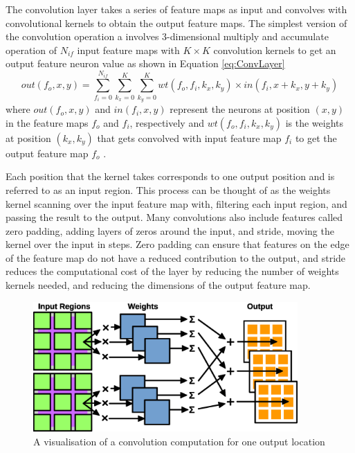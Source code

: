 \documentclass[12pt]{article}
\begin{document}
The convolution layer takes a series of feature maps as input and convolves with convolutional kernels to obtain the output feature maps. The simplest version of the convolution operation a involves 3-dimensional multiply and accumulate operation of $N_{if}$ input feature maps with $K\times K$ convolution kernels to get an output feature neuron value as shown in Equation \ref{eq:ConvLayer}
\begin{equation}
out(f_o,x,y)=\sum^{N_{if}}_{f_i=0} \sum^{K}_{k_x=0} \sum^{K}_{k_y=0} wt(f_o,f_i,k_x,k_y)\times in(f_i,x+k_x,y+k_y)
\label{eq:ConvLayer}
\end{equation}
where $out(f_o,x,y)$ and $in(f_i,x,y)$ represent the neurons at position $(x,y)$ in the feature maps $f_o$ and $f_i$, respectively and $wt(f_o,f_i,k_x,k_y)$ is the weights at position $(k_x,k_y)$ that gets convolved with input feature map $f_i$ to get the output feature map $f_o$ \cite{SudaFpgaAccelerator}.

Each position that the kernel takes corresponds to one output position and is referred to as an input region. This process can be thought of as the weights kernel scanning over the input feature map with, filtering each input region, and passing the result to the output. Many convolutions also include features called zero padding, adding layers of zeros around the input, and stride, moving the kernel over the input in steps. Zero padding can ensure that features on the edge of the feature map do not have a reduced contribution to the output, and stride reduces the computational cost of the layer by reducing the number of weights kernels needed, and reducing the dimensions of the output feature map.

\begin{figure} [H]
\centering
\includegraphics[width=0.9\textwidth]{figures/conv.eps}
\caption{A visualisation of a convolution computation for one output location}
\label{fig:conv}
\end{figure}
\end{document}
